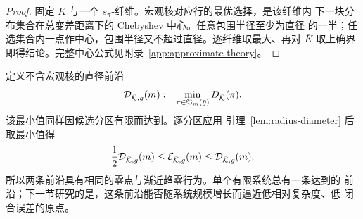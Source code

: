 \begin{proof}
固定 $\bar K$ 与一个 $s_\pi$-纤维。宏观核对应行的最优选择，是该纤维内
下一块分布集合在总变差距离下的 Chebyshev 中心。任意包围半径至少为直径
的一半；任选集合内一点作中心，包围半径又不超过直径。逐纤维取最大、再对
$\bar K$ 取上确界即得结论。完整中心公式见附录~\ref{app:approximate-theory}。
\end{proof}

定义不含宏观核的直径前沿
\begin{equation}
 \mathcal D_{\bar{\mathcal K},\bar g}(m)
 :=\min_{\pi\in\mathfrak P_m(\bar g)}D_{\bar{\mathcal K}}(\pi).
 \label{eq:diameter-frontier}
\end{equation}
该最小值同样因候选分区有限而达到。逐分区应用
引理~\ref{lem:radius-diameter} 后取最小值得
\begin{equation}
 \frac12\mathcal D_{\bar{\mathcal K},\bar g}(m)
 \le\mathcal E_{\bar{\mathcal K},\bar g}(m)
 \le\mathcal D_{\bar{\mathcal K},\bar g}(m).
 \label{eq:frontier-radius-diameter}
\end{equation}
所以两条前沿具有相同的零点与渐近趋零行为。单个有限系统总有一条达到的
前沿；下一节研究的是，这条前沿能否随系统规模增长而逼近低相对复杂度、低
闭合误差的原点。
